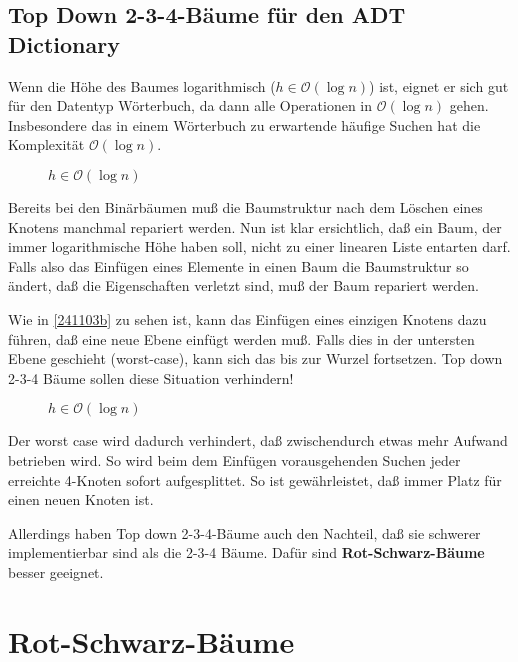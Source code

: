 \documentclass[ngerman,draft,parskip=half*,twoside]{scrreprt}
\theoremstyle{break}
\theoremstyle{nonumberbreak}
\newcommand*{\OO}{\mathcal{O}}      %
\begin{document}
\subsection{Top Down 2-3-4-Bäume für den ADT Dictionary}

Wenn die Höhe des Baumes logarithmisch ($h \in \OO(\log n)$) ist, eignet er sich gut für den Datentyp
Wörterbuch, da dann alle Operationen in $\OO(\log n)$ gehen. Insbesondere das in einem Wörterbuch zu erwartende häufige Suchen hat
die Komplexität $\OO(\log n)$.

\begin{figure}[H]
    \centering
    \caption{$h \in \OO(\log n)$}
    \label{241103a}
 \end{figure}	

Bereits bei den Binärbäumen muß die Baumstruktur nach dem Löschen eines Knotens manchmal repariert werden.
Nun ist klar ersichtlich, daß ein Baum, der immer logarithmische Höhe haben soll, nicht zu einer linearen Liste entarten darf. 	
Falls also das Einfügen eines Elemente in einen Baum die Baumstruktur so ändert, daß die Eigenschaften 
verletzt sind, muß der Baum repariert werden.

Wie in \autoref{241103b} zu sehen ist, kann das Einfügen eines einzigen Knotens dazu führen, daß eine neue Ebene
einfügt werden muß. Falls dies in der untersten Ebene geschieht (worst-case), kann sich das bis zur Wurzel fortsetzen.	
Top down 2-3-4 Bäume sollen diese Situation verhindern! 
 
 \begin{figure}[H]
    \centering
    \caption{$h \in \OO(\log n)$}
    \label{241103b}
 \end{figure}

Der worst case wird dadurch verhindert, daß zwischendurch etwas mehr Aufwand betrieben wird.
So wird beim dem Einfügen vorausgehenden Suchen jeder erreichte 4-Knoten sofort aufgesplittet.
So ist gewährleistet, daß immer Platz für einen neuen Knoten ist.

Allerdings haben Top down 2-3-4-Bäume auch den Nachteil, daß sie schwerer implementierbar sind als die 2-3-4 Bäume. 
    Dafür sind \textbf{Rot-Schwarz-Bäume} besser geeignet. %

\section{Rot-Schwarz-Bäume}
 
\end{document}
